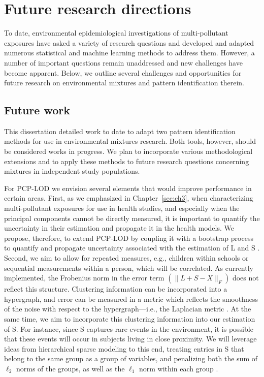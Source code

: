 
\section{Future research directions}\label{sec:future}
To date, environmental epidemiological investigations of multi-pollutant exposures have asked a variety of research questions and developed and adapted numerous statistical and machine learning methods to address them. However, a number of important questions remain unaddressed and new challenges have become apparent. Below, we outline several challenges and opportunities for future research on environmental mixtures and pattern identification therein.

\subsection{Future work}\label{diss:future}
This dissertation detailed work to date to adapt two pattern identification methods for use in environmental mixtures research. Both tools, however, should be considered works in progress. We plan to incorporate various methodological extensions and to apply these methods to future research questions concerning mixtures in independent study populations.

For PCP-LOD we envision several elements that would improve performance in certain areas. First, as we emphasized in Chapter~\ref{sec:ch3}, when characterizing multi-pollutant exposures for use in health studies, and especially when the principal components cannot be directly measured, it is important to quantify the uncertainty in their estimation and propagate it in the health models. We propose, therefore, to extend PCP-LOD by coupling it with a bootstrap process to quantify and propagate uncertainty associated with the estimation of L and S \citep{mak14_unc}. Second, we aim to allow for repeated measures, e.g., children within schools or sequential measurements within a person, which will be correlated. As currently implemented, the Frobenius norm in the error term $\left( \|L+S-X\|_{F} \right)$ does not reflect this structure. Clustering information can be incorporated into a hypergraph, and error can be measured in a metric which reflects the smoothness of the noise with respect to the hypergraph---i.e., the Laplacian metric \citep{zhou2006learning, kaminski2019clustering}. At the same time, we aim to incorporate this clustering information into our estimation of S. For instance, since S captures rare events in the environment, it is possible that these events will occur in subjects living in close proximity. We will leverage ideas from hierarchical sparse modeling to this end, treating entries in S that belong to the same group as a group of variables, and penalizing both the sum of $\ell_2$ norms of the groups, as well as the $\ell_1$ norm within each group \citep{yan2017hierarchical, sprechmann2011c, jenatton2011proximal}.

